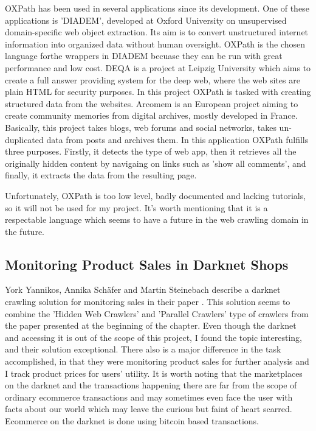 \documentclass[12pt,a4paper,twoside]{report}
\begin{document}
OXPath has been used in several applications since its development. One of these applications is 'DIADEM', developed at Oxford University on unsupervised domain-specific web object extraction. Its aim is to convert unstructured internet information into organized data without human oversight. OXPath is the chosen language forthe wrappers in DIADEM becuase they can be run with great performance and low cost. DEQA is a project at Leipzig University which aims to create a full answer providing system for the deep web, where the web sites are plain HTML for security purposes. In this project OXPath is tasked with creating structured data from the websites. Arcomem is an European project aiming to create community memories from digital archives, mostly developed in France. Basically, this project takes blogs, web forums and social networks, takes un-duplicated data from posts and archives them. In this application OXPath fulfills three purposes. Firstly, it detects the type of web app, then it retrieves all the originally hidden content by navigaing on links such as 'show all comments', and finally, it extracts the data from the resulting page.

Unfortunately, OXPath is too low level, badly documented and lacking tutorials, so it will not be used for my project. It's worth mentioning that it is a respectable language which seems to have a future in the web crawling domain in the future.


\subsection{Monitoring Product Sales in Darknet Shops}

York Yannikos, Annika Schäfer and Martin Steinebach describe a darknet crawling solution for monitoring sales in their paper \cite{darknet_crawling}. This solution seems to combine the 'Hidden Web Crawlers' and 'Parallel Crawlers' type of crawlers from the paper \cite{crawlers_paper1} presented at the beginning of the chapter. Even though the darknet and accessing it is out of the scope of this project, I found the topic interesting, and their solution exceptional. There also is a major difference in the task accomplished, in that they were monitoring product sales for further analysis and I track product prices for users' utility. It is worth noting that the marketplaces on the darknet and the transactions happening there are far from the scope of ordinary ecommerce transactions and may sometimes even face the user with facts about our world which may leave the curious but faint of heart scarred. Ecommerce on the darknet is done using bitcoin based transactions.
\end{document}
